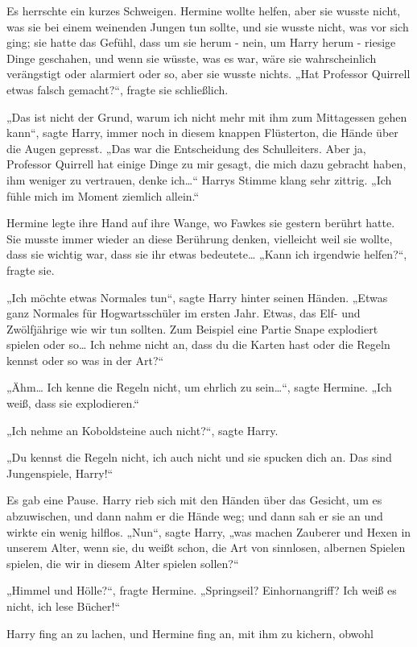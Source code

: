 {Es herrschte ein kurzes Schweigen. Hermine wollte helfen, aber sie wusste nicht, was sie bei einem weinenden Jungen tun sollte, und sie wusste nicht, was vor sich ging; sie hatte das Gefühl, dass um sie herum - nein, um Harry herum - riesige Dinge geschahen, und wenn sie wüsste, was es war, wäre sie wahrscheinlich verängstigt oder alarmiert oder so, aber sie wusste nichts. „Hat Professor Quirrell etwas falsch gemacht?“, fragte sie schließlich.

„Das ist nicht der Grund, warum ich nicht mehr mit ihm zum Mittagessen gehen kann“, sagte Harry, immer noch in diesem knappen Flüsterton, die Hände über die Augen gepresst. „Das war die Entscheidung des Schulleiters. Aber ja, Professor Quirrell hat einige Dinge zu mir gesagt, die mich dazu gebracht haben, ihm weniger zu vertrauen, denke ich…“ Harrys Stimme klang sehr zittrig. „Ich fühle mich im Moment ziemlich allein.“

Hermine legte ihre Hand auf ihre Wange, wo Fawkes sie gestern berührt hatte. Sie musste immer wieder an diese Berührung denken, vielleicht weil sie wollte, dass sie wichtig war, dass sie ihr etwas bedeutete… „Kann ich irgendwie helfen?“, fragte sie.

„Ich möchte etwas Normales tun“, sagte Harry hinter seinen Händen. „Etwas ganz Normales für Hogwartsschüler im ersten Jahr. Etwas, das Elf- und Zwölfjährige wie wir tun sollten. Zum Beispiel eine Partie Snape explodiert spielen oder so… Ich nehme nicht an, dass du die Karten hast oder die Regeln kennst oder so was in der Art?“

„Ähm… Ich kenne die Regeln nicht, um ehrlich zu sein…“, sagte Hermine. „Ich weiß, dass sie explodieren.“

„Ich nehme an Koboldsteine auch nicht?“, sagte Harry.

„Du kennst die Regeln nicht, ich auch nicht und sie spucken dich an. Das sind Jungenspiele, Harry!“

Es gab eine Pause. Harry rieb sich mit den Händen über das Gesicht, um es abzuwischen, und dann nahm er die Hände weg; und dann sah er sie an und wirkte ein wenig hilflos. „Nun“, sagte Harry, „was machen Zauberer und Hexen in unserem Alter, wenn sie, du weißt schon, die Art von sinnlosen, albernen Spielen spielen, die wir in diesem Alter spielen sollen?“

„Himmel und Hölle?“, fragte Hermine. „Springseil? Einhornangriff? Ich weiß es nicht, ich lese Bücher!“

Harry fing an zu lachen, und Hermine fing an, mit ihm zu kichern, obwohl

}
